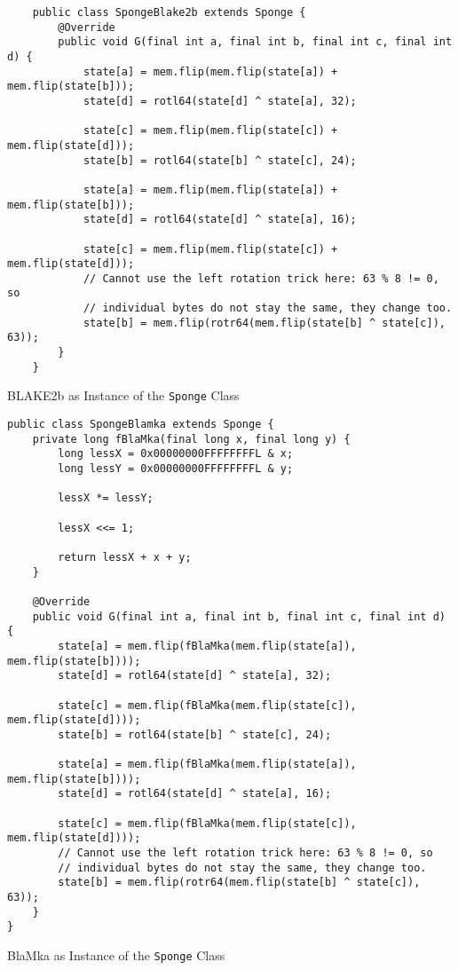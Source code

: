 \begin{listing}
\begin{verbatim}
    public class SpongeBlake2b extends Sponge {
        @Override
        public void G(final int a, final int b, final int c, final int d) {
            state[a] = mem.flip(mem.flip(state[a]) + mem.flip(state[b]));
            state[d] = rotl64(state[d] ^ state[a], 32);

            state[c] = mem.flip(mem.flip(state[c]) + mem.flip(state[d]));
            state[b] = rotl64(state[b] ^ state[c], 24);

            state[a] = mem.flip(mem.flip(state[a]) + mem.flip(state[b]));
            state[d] = rotl64(state[d] ^ state[a], 16);

            state[c] = mem.flip(mem.flip(state[c]) + mem.flip(state[d]));
            // Cannot use the left rotation trick here: 63 % 8 != 0, so
            // individual bytes do not stay the same, they change too.
            state[b] = mem.flip(rotr64(mem.flip(state[b] ^ state[c]), 63));
        }
    }
\end{verbatim}
\normalsize
\caption{BLAKE2b as Instance of the \texttt{Sponge} Class}
\label{fig:sponge-blake2b}
\end{listing}


\begin{listing}
\begin{verbatim}
public class SpongeBlamka extends Sponge {
    private long fBlaMka(final long x, final long y) {
        long lessX = 0x00000000FFFFFFFFL & x;
        long lessY = 0x00000000FFFFFFFFL & y;

        lessX *= lessY;

        lessX <<= 1;

        return lessX + x + y;
    }

    @Override
    public void G(final int a, final int b, final int c, final int d) {
        state[a] = mem.flip(fBlaMka(mem.flip(state[a]), mem.flip(state[b])));
        state[d] = rotl64(state[d] ^ state[a], 32);

        state[c] = mem.flip(fBlaMka(mem.flip(state[c]), mem.flip(state[d])));
        state[b] = rotl64(state[b] ^ state[c], 24);

        state[a] = mem.flip(fBlaMka(mem.flip(state[a]), mem.flip(state[b])));
        state[d] = rotl64(state[d] ^ state[a], 16);

        state[c] = mem.flip(fBlaMka(mem.flip(state[c]), mem.flip(state[d])));
        // Cannot use the left rotation trick here: 63 % 8 != 0, so
        // individual bytes do not stay the same, they change too.
        state[b] = mem.flip(rotr64(mem.flip(state[b] ^ state[c]), 63));
    }
}
\end{verbatim}
\normalsize
\caption{BlaMka as Instance of the \texttt{Sponge} Class}
\label{fig:sponge-blamka}
\end{listing}
